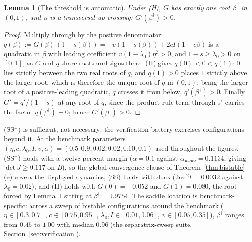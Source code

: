 \documentclass[11pt]{article}
\newtheorem{lemma}[theorem]{Lemma}
\theoremstyle{definition}
\theoremstyle{remark}
\numberwithin{equation}{section}
\begin{document}
\begin{lemma}[The threshold is automatic]\label{lem:root}
Under (H), $G$ has exactly one root $\beta^\dagger$ in $(0,1)$, and it is a transversal up-crossing: $G'(\beta^\dagger) > 0$.
\end{lemma}
\begin{proof}
Multiply through by the positive denominator: $q(\beta) := G(\beta)\,(1-s(\beta)) = -v(1-s(\beta)) + 2cI(1-c\beta)$ is a quadratic in $\beta$ with leading coefficient $v(1-\lambda_0)\eta^2 > 0$, and $1-s \ge \lambda_0 > 0$ on $[0,1]$, so $G$ and $q$ share roots and signs there. (H) gives $q(0) < 0 < q(1)$: $0$ lies strictly between the two real roots of $q$, and $q(1) > 0$ places $1$ strictly above the larger root, which is therefore the unique root of $q$ in $(0,1)$; being the larger root of a positive-leading quadratic, $q$ crosses it from below, $q'(\beta^\dagger) > 0$. Finally $G' = q'/(1-s)$ at any root of $q$, since the product-rule term through $s'$ carries the factor $q(\beta^\dagger) = 0$; hence $G'(\beta^\dagger) > 0$.
\end{proof}

(SS$^+$) is sufficient, not necessary: the verification battery exercises configurations beyond it. At the benchmark parameters $(\eta, c, \lambda_0, I, v, \alpha) = (0.5, 0.9, 0.02, 0.02, 0.10, 0.1)$ used throughout the figures, (SS$^+$) holds with a twelve percent margin ($\alpha = 0.1$ against $\alpha_{\mathrm{mono}} = 0.1134$, giving $\det J \ge 0.117$ on $B$), so the global-convergence clause of Theorem~\ref{thm:bistable}(e) covers the displayed dynamics; (SS) holds with slack ($2\alpha c^2 I = 0.0032$ against $\lambda_0 = 0.02$), and (H) holds with $G(0) = -0.052$ and $G(1) = 0.080$, the root forced by Lemma~\ref{lem:root} sitting at $\beta^\dagger = 0.9754$. The saddle location is benchmark-specific: across a sweep of bistable configurations around the benchmark ($\eta \in [0.3,0.7]$, $c \in [0.75,0.95]$, $\lambda_0, I \in [0.01,0.06]$, $v \in [0.05,0.35]$), $\beta^\dagger$ ranges from $0.45$ to $1.00$ with median $0.96$ (the separatrix-sweep suite, Section~\ref{sec:verification}).
\end{document}
